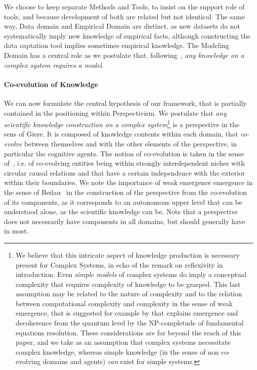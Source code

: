 \documentclass[runningheads,a4paper]{llncs2e/llncs}
\begin{document}
We choose to keep separate Methods and Tools, to insist on the support role of tools, and because development of both are related but not identical. The same way, Data domain and Empirical Domain are distinct, as new datasets do not systematically imply new knowledge of empirical facts, although constructing the data captation tool implies sometimes empirical knowledge. The Modeling Domain has a central role as we postulate that, following~\cite{giere2010agent}, \emph{any knowledge on a complex system requires a model}. 



\paragraph{Co-evolution of Knowledge}

  
We can now formulate the central hypothesis of our framework, that is partially contained in the positioning within Perspectivism. We postulate that \emph{any scientific knowledge construction on a complex system}\footnote{We believe that this intricate aspect of knowledge production is necessary present for Complex Systems, in echo of the remark on reflexivity in introduction. Even \emph{simple models} of complex systems do imply a conceptual complexity that requires complexity of knowledge to be grasped. This last assumption may be related to the nature of complexity and to the relation between computational complexity and complexity in the sense of weak emergence, that is suggested for example by \cite{2014arXiv1403.7686B} that explains emergence and decoherence from the quantum level by the NP-completude of fundamental equations resolution. These considerations are far beyond the reach of this paper, and we take as an assumption that complex systems necessitate complex knowledge, whereas simple knowledge (in the sense of non co-evolving domains and agents) \emph{can} exist for simple systems.} is a perspective in the sens of Giere. It is composed of knowledge contents within each domain, that \emph{co-evolve} between themselves and with the other elements of the perspective, in particular the cognitive agents. The notion of co-evolution is taken in the sense of~\cite{holland2012signals}, i.e. of co-evolving entities being within strongly interdependent niches with circular causal relations and that have a certain independence with the exterior within their boundaries. We note the importance of weak emergence emergence in the sense of Bedau~\cite{bedau2002downward} in the construction of the perspective from the co-evolution of its components, as it corresponds to an autonomous upper level that can be understood alone, as the scientific knowledge can be. Note that a perspective does not necessarily have components in all domains, but should generally have in most.
\end{document}
